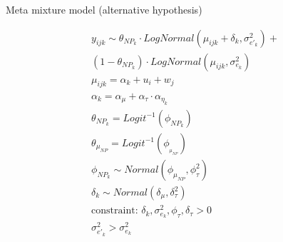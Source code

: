 \begin{frame}[fragile]{Meta mixture model (alternative hypothesis)}

	\begin{equation*}
		\begin{aligned}
		y_{ijk} \sim \theta_{{NP}_k} \cdot LogNormal(\mu_{ijk} + \delta_k, \sigma_{e'_k}^2) + \\
			(1 - \theta_{{NP}_k}) \cdot LogNormal(\mu_{ijk}, \sigma_{e_k}^2) \\
			\mu_{ijk} = \alpha_k + u_i + w_j\\
			\alpha_k = \alpha_{\mu} + \alpha_{\tau} \cdot \alpha_{\eta_k}\\
			\theta_{{NP}_k} = Logit^{-1}(\phi_{{NP}_k})\\
			\theta_{\mu_{NP}} = Logit^{-1}(\phi_{_{\mu_{NP}}})\\		
			\phi_{{NP}_k} \sim Normal(\phi_{\mu_{NP}}, \phi_{\tau}^2)\\
			\delta_k \sim Normal(\delta_{\mu}, \delta_{\tau}^2)\\
			\text{constraint: }\delta_k, \sigma_{e_k}^2, \phi_{\tau}, \delta_{\tau}>0\\
			\sigma_{e'_k}^2 > \sigma_{e_k}^2 
		\end{aligned}
	\end{equation*}
	
\end{frame}



